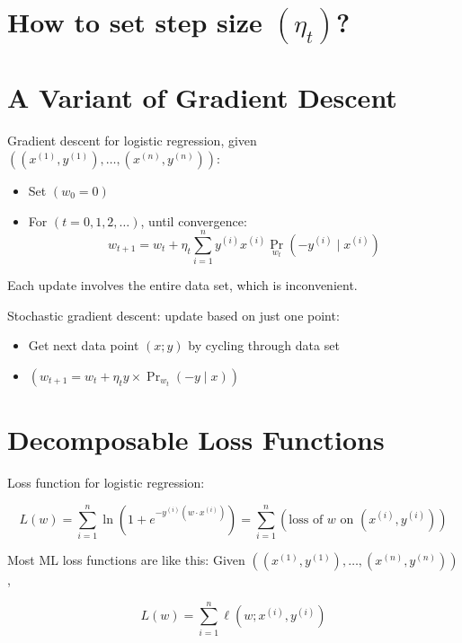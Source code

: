\documentclass{article}
\begin{document}
\section*{How to set step size $( \eta_{t} )$?}

\section*{A Variant of Gradient Descent}
Gradient descent for logistic regression, given $( \left(x^{(1)}, y^{(1)}\right), \ldots, \left(x^{(n)}, y^{(n)}\right) )$:

\begin{itemize}
    \item Set $( w_{0} = 0 )$
    \item For $( t = 0, 1, 2, \ldots )$, until convergence:
    \begin{equation}
    w_{t+1} = w_{t} + \eta_{t} \sum_{i=1}^{n} y^{(i)} x^{(i)} \operatorname{Pr}_{w_{t}}\left(-y^{(i)} \mid x^{(i)}\right)
    \end{equation}
\end{itemize}

Each update involves the entire data set, which is inconvenient.

Stochastic gradient descent: update based on just one point:

\begin{itemize}
    \item Get next data point $( x ; y )$ by cycling through data set
    \item $( w_{t+1} = w_{t} + \eta_{t} y \times \operatorname{Pr}_{w_{t}}(-y \mid x) )$
\end{itemize}

\section*{Decomposable Loss Functions}
Loss function for logistic regression:

\begin{equation}
L(w) = \sum_{i=1}^{n} \ln \left(1 + e^{-y^{(i)}\left(w \cdot x^{(i)}\right)}\right) = \sum_{i=1}^{n}\left(\text{loss of } w \text{ on }\left(x^{(i)}, y^{(i)}\right)\right)
\end{equation}

Most ML loss functions are like this: Given $( \left(x^{(1)}, y^{(1)}\right), \ldots, \left(x^{(n)}, y^{(n)}\right) )$,

\begin{equation}
L(w) = \sum_{i=1}^{n} \ell\left(w ; x^{(i)}, y^{(i)}\right)
\end{equation}
\end{document}
